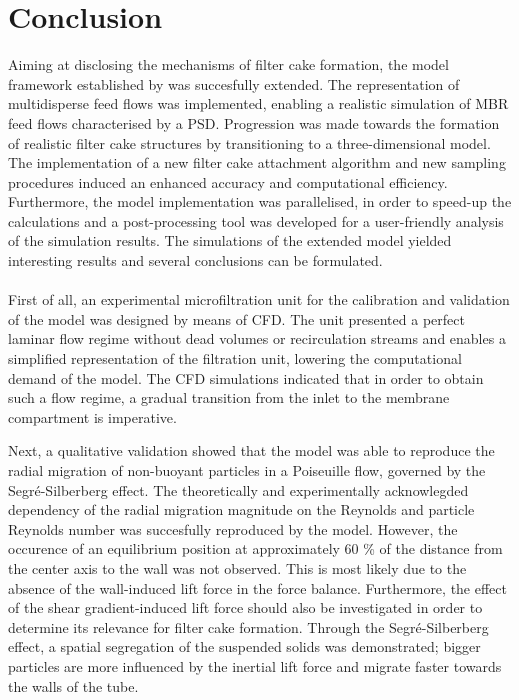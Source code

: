\chapter[Conclusion]%
{Conclusion \label{ch:concl}}
Aiming at disclosing the mechanisms of filter cake formation, the model framework established by \cite{Ghijs2014} %
was succesfully extended. The representation of multidisperse feed flows was implemented, enabling a realistic simulation of \gls{MBR} feed flows characterised by a \gls{PSD}. Progression was made towards the formation of realistic filter cake structures by transitioning to a three-dimensional model. The implementation of a new filter cake attachment algorithm and new sampling procedures induced an enhanced accuracy and computational efficiency. Furthermore, the model implementation was parallelised, in order to speed-up the calculations and a post-processing tool was developed for a user-friendly analysis of the simulation results.
The simulations of the extended model yielded interesting results and several conclusions can be formulated. \\ \\
First of all, an experimental microfiltration unit for the calibration and validation of the model was designed by means of \gls{CFD}. The unit presented a perfect laminar flow regime without dead volumes or recirculation streams and enables a simplified representation of the filtration unit, lowering the computational demand of the model. The \gls{CFD} simulations indicated that in order to obtain such a flow regime, a gradual transition from the inlet to the membrane compartment is imperative. \par
Next, a qualitative validation showed that the model was able to reproduce the radial migration of non-buoyant particles in a Poiseuille flow, governed by the Segr\'e-Silberberg effect. The theoretically and experimentally acknowlegded dependency of the radial migration magnitude on the Reynolds and particle Reynolds number was succesfully reproduced by the model. However, the occurence of an equilibrium position at approximately 60 \% of the distance from the center axis to the wall was not observed. This is most likely due to the absence of the wall-induced lift force in the force balance. Furthermore, the effect of the shear gradient-induced lift force should also be investigated in order to determine its relevance for filter cake formation. Through the Segr\'e-Silberberg effect, a spatial segregation of the suspended solids was demonstrated; bigger particles are more influenced by the inertial lift force and migrate faster towards the walls of the tube. \par
